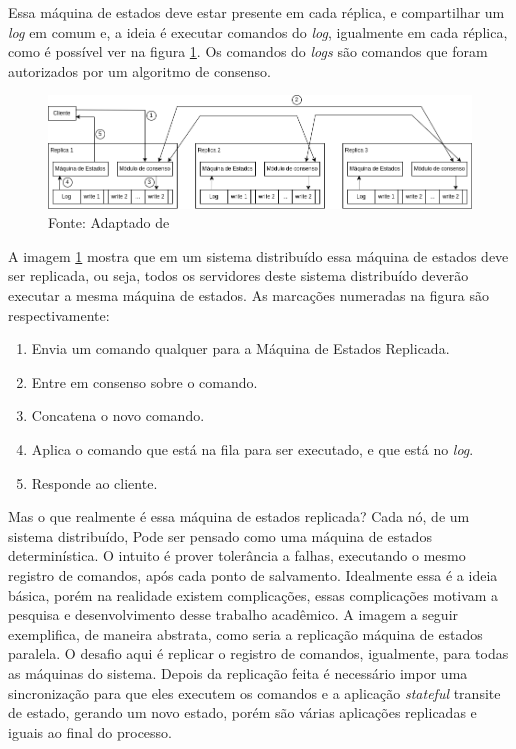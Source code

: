 Essa máquina de estados deve estar presente em cada réplica, e compartilhar um \textit{log} em comum e, a ideia é executar comandos do \textit{log}, igualmente em cada réplica, como é possível ver na figura \ref{fig:rms}. Os comandos do \textit{logs} são comandos que foram autorizados por um algoritmo de consenso.

\begin{figure}[htb!]
\centering
\includegraphics[width=1\linewidth]{figures/rms.drawio.png}
\caption{Fonte: Adaptado de \textcite[p.~233]{journals/dbsk/SkrzypzcakS20}}
\label{fig:rms}
\end{figure}

A imagem \ref{fig:rms} mostra que em um sistema distribuído essa máquina de estados deve ser replicada, ou seja, todos os servidores deste sistema distribuído deverão executar a mesma máquina de estados. As marcações numeradas na figura são respectivamente:

\begin{enumerate}
\item Envia um comando qualquer para a Máquina de Estados Replicada.
\item Entre em consenso sobre o comando.
\item Concatena o novo comando.
\item Aplica o comando que está na fila para ser executado, e que está no \textit{log}.
\item Responde ao cliente.
\end{enumerate}

Mas o que realmente é essa máquina de estados replicada? Cada nó, de um sistema distribuído, Pode ser pensado como uma máquina de estados determinística. O intuito é prover tolerância a falhas, executando o mesmo registro de comandos, após cada ponto de salvamento. Idealmente essa é a ideia básica, porém na realidade existem  complicações, essas complicações motivam a pesquisa e desenvolvimento desse trabalho acadêmico. A imagem a seguir exemplifica, de maneira abstrata, como seria a replicação máquina de estados paralela. O desafio aqui é replicar o registro de comandos, igualmente, para todas as máquinas do sistema. Depois da replicação feita é necessário impor uma sincronização para que eles executem os comandos e a aplicação \textit{stateful} transite de estado, gerando um novo estado, porém são várias aplicações replicadas e iguais ao final do processo.

